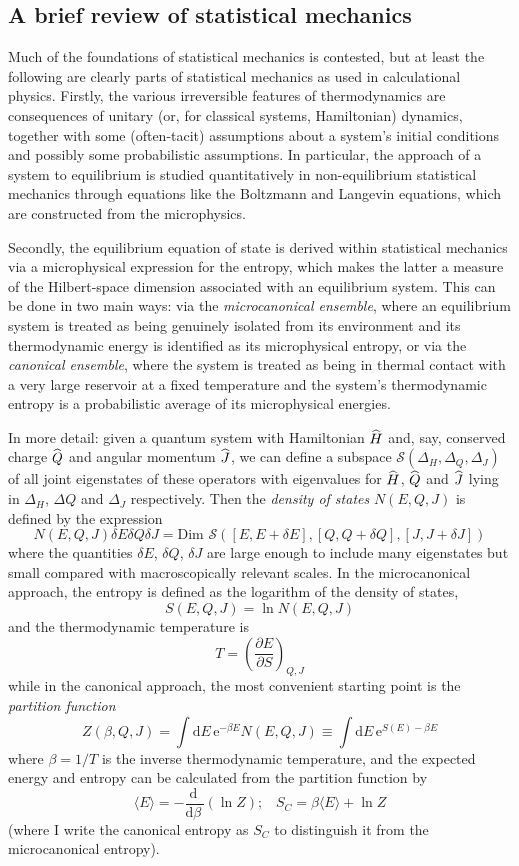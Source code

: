 \documentclass[12pt]{article}
\newcommand{\dr}[1]{\ensuremath{\mathrm{d} #1\,}}
\newcommand{\mc}[1]{\ensuremath{\mathcal{#1}}}
\newcommand{\dbd}[2]{\ensuremath{\frac{\dr{#1}}{\dr{#2}}}}
\newcommand{\pbp}[2]{\ensuremath{\frac{\partial #1}{\partial #2}}}
\newcommand{\op}[1]{\ensuremath{\widehat{\textsf{\ensuremath{#1}}}}}
\newcommand{\be}{\begin{equation}}
\newcommand{\ee}{\end{equation}}
\newcommand{\e}[1]{\mathrm{e}^{#1}}
\begin{document}
\subsection{A brief review of statistical mechanics}



Much of the foundations of statistical mechanics is contested, but at least the following are clearly parts of statistical mechanics as used in calculational physics. Firstly, the various irreversible features of thermodynamics are consequences of unitary (or, for classical systems, Hamiltonian) dynamics, together with some (often-tacit) assumptions about a system's initial conditions and possibly some probabilistic assumptions. In particular, the approach of a system to equilibrium is studied quantitatively in non-equilibrium statistical mechanics through equations like the Boltzmann and Langevin equations, which are constructed from the microphysics.

Secondly, the equilibrium equation of state is derived within statistical mechanics via a microphysical expression for the entropy, which makes the latter a measure of the Hilbert-space dimension associated with an equilibrium system. This can be done in two main ways: via the \emph{microcanonical ensemble}, where an equilibrium system is treated as being genuinely isolated from its environment and its thermodynamic energy is identified as its microphysical entropy, or via the \emph{canonical ensemble}, where the system is treated as being in thermal contact with a very large reservoir at a fixed temperature and the system's thermodynamic entropy is a probabilistic average of its microphysical energies. 

In more detail: given a quantum system with Hamiltonian \op{H} and, say, conserved charge $\op{Q}$ and angular momentum $\op{J}$, we can define a subspace $\mc{S}(\Delta_H,\Delta_Q,\Delta_J)$ of all joint eigenstates of these operators with eigenvalues for  $\op{H}$, $\op{Q}$ and $\op{J}$ lying in $\Delta_H$, $\Delta Q$ and $\Delta_J$ respectively. Then the \emph{density of states} $N(E,Q,J)$ is defined by the expression
\be
N(E,Q,J)\delta E \delta Q\delta J = \mathrm{Dim} \,\,\mc{S}([E,E+\delta E],[Q,Q+\delta Q],[J,J+\delta J])
\ee
where the quantities $\delta E$, $\delta Q$, $\delta J$ are large enough to include many eigenstates but small compared with macroscopically relevant scales. In the microcanonical approach, the entropy is defined as the logarithm of the density of states, 
\be
S(E,Q,J)= \ln N(E,Q,J)
\ee
and the thermodynamic temperature is 
\be
T = \left(\pbp{E}{S}\right)_{Q,J}
\ee
while in the canonical approach, the  most convenient starting point is the \emph{partition function}
 \be \label{partitionfunction}
Z (\beta,Q,J) = \int \dr{E}\e{-\beta E} N(E,Q,J) \equiv \int \dr{E} \e{S(E)-\beta E}
 \ee
 where $\beta=1/T$ is the inverse thermodynamic temperature, and the expected energy and entropy can be calculated from the partition function by
 \be
 \langle E \rangle = -\dbd{}{\beta}(\ln Z);\,\,\,\,\, S_C = \beta \langle E \rangle + \ln Z
 \ee 
 (where I write the canonical entropy as $S_C$ to distinguish it from the microcanonical entropy).
\end{document}
